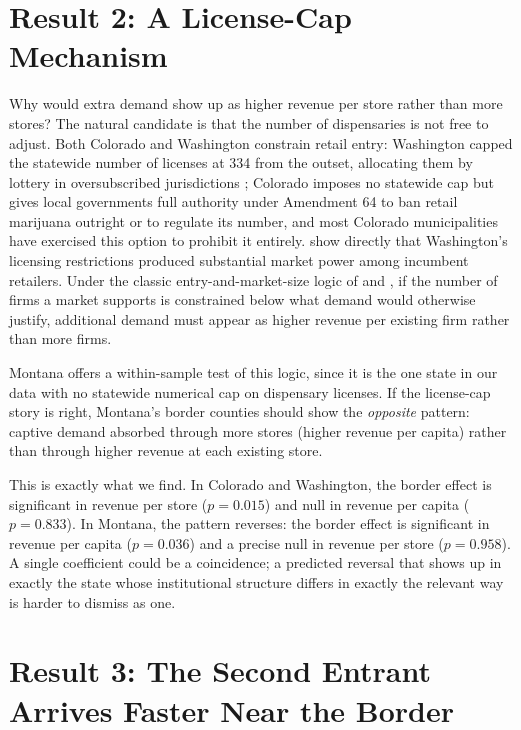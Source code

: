 \documentclass[12pt]{article}
\begin{document}
\section{Result 2: A License-Cap Mechanism}
\label{sec:result2}

Why would extra demand show up as higher revenue per store rather than more stores? The natural candidate is
that the number of dispensaries is not free to adjust. Both Colorado and Washington constrain retail entry:
Washington capped the statewide number of licenses at 334 from the outset, allocating them by lottery in
oversubscribed jurisdictions \citep{WSLCB2014LotteryPR}; Colorado imposes no statewide cap but gives local
governments full authority under Amendment 64 to ban retail marijuana outright or to regulate its number,
and most Colorado municipalities have exercised this option to prohibit it entirely. \citet{HollenbeckUetake2021}
show directly that Washington's licensing restrictions produced substantial market power among incumbent
retailers. Under the classic entry-and-market-size logic of \citet{BresnahanReiss1990} and
\citet{BresnahanReiss1991}, if the number of firms a market supports is constrained below what demand would
otherwise justify, additional demand must appear as higher revenue per existing firm rather than more firms.

Montana offers a within-sample test of this logic, since it is the one state in our data with no statewide
numerical cap on dispensary licenses. If the license-cap story is right, Montana's border counties should
show the \emph{opposite} pattern: captive demand absorbed through more stores (higher revenue per capita)
rather than through higher revenue at each existing store.



This is exactly what we find. In Colorado and Washington, the border effect is significant in revenue per
store ($p=0.015$) and null in revenue per capita ($p=0.833$). In Montana, the pattern reverses: the border
effect is significant in revenue per capita ($p=0.036$) and a precise null in revenue per store ($p=0.958$).
A single coefficient could be a coincidence; a predicted reversal that shows up in exactly the state whose
institutional structure differs in exactly the relevant way is harder to dismiss as one.

\section{Result 3: The Second Entrant Arrives Faster Near the Border}
\label{sec:result3}
\end{document}
